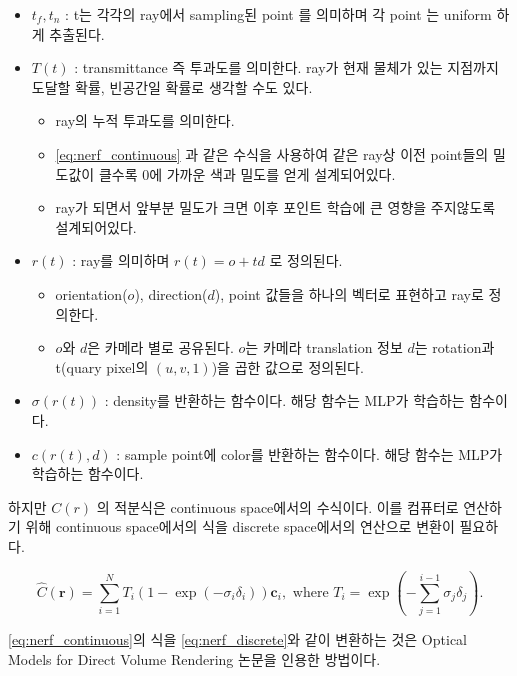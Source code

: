 \documentclass{vipweekly}
\begin{document}
\begin{itemize}
    \item $t_f , t_n$ : t는 각각의 ray에서 sampling된 point 를 의미하며 각 point 는 uniform 하게 추출된다.
    \item $T(t)$ : transmittance 즉 투과도를 의미한다. ray가 현재 물체가 있는 지점까지 도달할 확률, 빈공간일 확률로 생각할 수도 있다.
    \begin{itemize}
        \item ray의 누적 투과도를 의미한다.
        \item \eqref{eq:nerf_continuous} 과 같은 수식을 사용하여 같은 ray상 이전 point들의 밀도값이 클수록 0에 가까운 색과 밀도를 얻게 설계되어있다.
        \item ray가 되면서 앞부분 밀도가 크면 이후 포인트 학습에 큰 영향을 주지않도록 설계되어있다.
    \end{itemize}

    \item $r(t)$ : ray를 의미하며  $r(t) =o + td$  로 정의된다.
    \begin{itemize}
        \item orientation($o$), direction($d$), point 값들을 하나의 벡터로 표현하고 ray로 정의한다.
        \item $o$와 $d$은 카메라 별로 공유된다. 
        $o$는 카메라 translation 정보 $d$는 rotation과 t(quary pixel의 $(u,v,1)$)을 곱한 값으로 정의된다.   
    \end{itemize}

    \item $\sigma(r(t))$ : density를 반환하는 함수이다. 해당 함수는 MLP가 학습하는 함수이다.
    \item $c(r(t),d)$ : sample point에 color를 반환하는 함수이다. 해당 함수는 MLP가 학습하는 함수이다.
\end{itemize}

하지만 $C(r)$ 의 적분식은 continuous space에서의 수식이다. 이를 컴퓨터로 연산하기 위해 
continuous space에서의 식을 discrete space에서의 연산으로 변환이 필요하다. 

\begin{equation}
    \hat{C}(\mathbf{r})=\sum_{i=1}^{N} T_{i}\left(1-\exp \left(-\sigma_{i} \delta_{i}\right)\right) \mathbf{c}_{i}, \text { where } T_{i}=\exp \left(-\sum_{j=1}^{i-1} \sigma_{j} \delta_{j}\right).
    \label{eq:nerf_discrete}
\end{equation}
    
\eqref{eq:nerf_continuous}의 식을 \eqref{eq:nerf_discrete}와 같이 변환하는 것은 Optical Models for Direct Volume Rendering\cite{volume} 논문을 인용한 방법이다.
\end{document}
